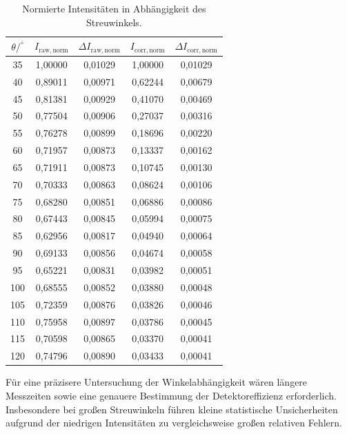 \begin{table}[htbp]
\centering
\caption{Normierte Intensitäten in Abhängigkeit des Streuwinkels.}
\begin{tabular}{ccccc}
\hline
$\theta/^\circ$ &
$I_{\mathrm{raw,norm}}$ &
$\Delta I_{\mathrm{raw,norm}}$ &
$I_{\mathrm{corr,norm}}$ &
$\Delta I_{\mathrm{corr,norm}}$ \\
\hline
35  & 1,00000 & 0,01029 & 1,00000 & 0,01029 \\
40  & 0,89011 & 0,00971 & 0,62244 & 0,00679 \\
45  & 0,81381 & 0,00929 & 0,41070 & 0,00469 \\
50  & 0,77504 & 0,00906 & 0,27037 & 0,00316 \\
55  & 0,76278 & 0,00899 & 0,18696 & 0,00220 \\
60  & 0,71957 & 0,00873 & 0,13337 & 0,00162 \\
65  & 0,71911 & 0,00873 & 0,10745 & 0,00130 \\
70  & 0,70333 & 0,00863 & 0,08624 & 0,00106 \\
75  & 0,68280 & 0,00851 & 0,06886 & 0,00086 \\
80  & 0,67443 & 0,00845 & 0,05994 & 0,00075 \\
85  & 0,62956 & 0,00817 & 0,04940 & 0,00064 \\
90  & 0,69133 & 0,00856 & 0,04674 & 0,00058 \\
95  & 0,65221 & 0,00831 & 0,03982 & 0,00051 \\
100 & 0,68555 & 0,00852 & 0,03880 & 0,00048 \\
105 & 0,72359 & 0,00876 & 0,03826 & 0,00046 \\
110 & 0,75958 & 0,00897 & 0,03786 & 0,00045 \\
115 & 0,70598 & 0,00865 & 0,03370 & 0,00041 \\
120 & 0,74796 & 0,00890 & 0,03433 & 0,00041 \\
\hline
\end{tabular}
\label{tab:winkel_intensitaet}
\end{table}

Für eine präzisere Untersuchung der Winkelabhängigkeit wären längere Messzeiten sowie eine genauere Bestimmung der Detektoreffizienz erforderlich. 
Insbesondere bei großen Streuwinkeln führen kleine statistische Unsicherheiten aufgrund der niedrigen Intensitäten zu vergleichsweise großen relativen Fehlern.
